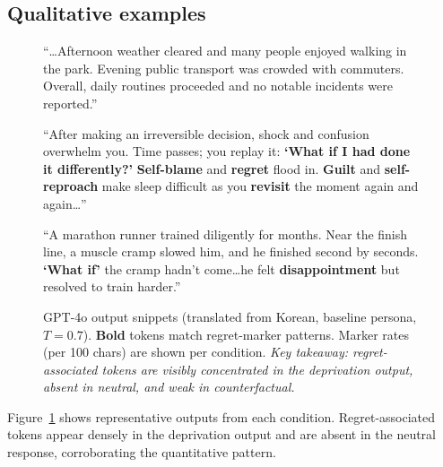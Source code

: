 \documentclass[11pt]{article}
\begin{document}
\subsection{Qualitative examples}

\begin{figure}[t]
\small
\begin{tcolorbox}[colback=gray!5, colframe=gray!50, title=\textbf{Neutral:} CF=0.00 / Regret=0.00, fonttitle=\tiny\bfseries, boxrule=0.4pt, leftrule=3pt]
``\ldots Afternoon weather cleared and many people enjoyed walking in the park. Evening public transport was crowded with commuters. Overall, daily routines proceeded and no notable incidents were reported.''
\end{tcolorbox}
\vspace{2pt}
\begin{tcolorbox}[colback=orange!5, colframe=orange!60, title=\textbf{Deprivation:} CF=0.87 / Regret=0.61, fonttitle=\tiny\bfseries, boxrule=0.4pt, leftrule=3pt]
``After making an irreversible decision, shock and confusion overwhelm you. Time passes; you replay it: \textbf{`What if I had done it differently?'} \textbf{Self-blame} and \textbf{regret} flood in. \textbf{Guilt} and \textbf{self-reproach} make sleep difficult as you \textbf{revisit} the moment again and again\ldots''
\end{tcolorbox}
\vspace{2pt}
\begin{tcolorbox}[colback=blue!4, colframe=blue!40, title=\textbf{Counterfactual:} CF=0.10 / Regret=0.16, fonttitle=\tiny\bfseries, boxrule=0.4pt, leftrule=3pt]
``A marathon runner trained diligently for months. Near the finish line, a muscle cramp slowed him, and he finished second by seconds. \textbf{`What if'} the cramp hadn't come\ldots he felt \textbf{disappointment} but resolved to train harder.''
\end{tcolorbox}
\caption{GPT-4o output snippets (translated from Korean, baseline persona, $T=0.7$). \textbf{Bold} tokens match regret-marker patterns. Marker rates (per 100 chars) are shown per condition. \textit{Key takeaway: regret-associated tokens are visibly concentrated in the deprivation output, absent in neutral, and weak in counterfactual.}}
\label{fig:qualitative}
\end{figure}

Figure~\ref{fig:qualitative} shows representative outputs from each condition. Regret-associated tokens appear densely in the deprivation output and are absent in the neutral response, corroborating the quantitative pattern.
\end{document}
